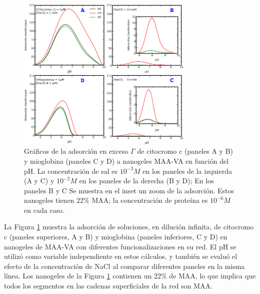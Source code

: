\begin{figure}[!htb]
	\centering
\includegraphics[width=0.75\textwidth]{Figures/graphs-gel2/ad-maa-pH-proteins.pdf}
\caption{Gr\'aficos de la adsorci\'on en exceso $\Gamma$ de citocromo c (paneles A y B) y mioglobina (paneles C y D) a nanogeles MAA-VA en funci\'on del pH.
	La concentraci\'on de sal es $10^{-3}M$ en los paneles de la izquierda (A y C) y $10^{-2}M$ en los paneles de la derecha
	(B y D);  En los paneles B y C Se muestra en el inset un zoom de la adsorci\'on.
	Estos nanogeles tienen 22\% MAA; la concentraci\'on de prote\'ina es $10^{-6}M$ en cada caso.}
\label{fig:esf:adsorption-vs-pH-cyto-myo}
\end{figure}
 
 La Figura \ref{fig:esf:adsorption-vs-pH-cyto-myo} muestra la adsorci\'on de soluciones, en diluci\'on infinita, de citocromo c (paneles superiores, A y B) y mioglobina (paneles inferiores, C y D) en nanogeles de MAA-VA con diferentes funcionalizaciones en su red. El pH se utiliz\'o como variable independiente en estos c\'alculos, y tambi\'en se evalu\'o el efecto de la concentraci\'on de NaCl al comparar diferentes paneles en la misma l\'inea. Los nanogeles de la Figura \ref{fig:esf:adsorption-vs-pH-cyto-myo} contienen un $22\%$ de MAA, lo que implica que todos los segmentos en las cadenas superficiales de la red son MAA.
 
